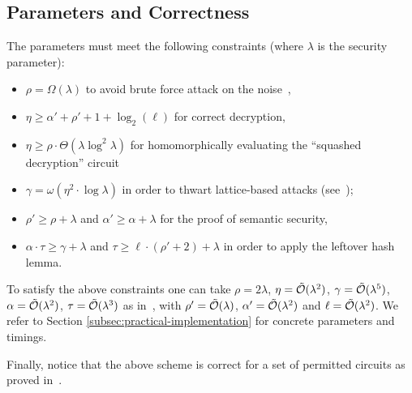 \documentclass{llncs}
\renewcommand\geq\geqslant
\newcommand{\Ot}[1]{{\cal \tilde O}(#1)}
\newcommand\ignore[1]{}
\begin{document}
\subsection{Parameters and Correctness}

\label{s:constraints}

 The parameters must meet the following constraints (where $\lambda$ is the security parameter):
\begin{itemize}
\renewcommand{\labelitemi}{\tiny $\bullet$}
\itemsep.4em
\item $\rho = \Omega(\lambda)$ to avoid brute force attack on the noise~\cite{CN2012,CNT2012},

\item $\eta \geq \alpha'+\rho'+1+\log_2(\ell)$ for correct decryption,

\item  $\eta\geq \rho \cdot \Theta(\lambda\log^2\lambda)$ for
  homomorphically evaluating the ``squashed decryption'' circuit

\item $\gamma = \omega(\eta^2\cdot \log\lambda)$ in order to thwart
  lattice-based attacks (see~\cite{vDGHV2010,CMNT2011});

\item $\rho' \geq \rho + \lambda$ and  $\alpha' \geq \alpha+\lambda$  for
  the proof of semantic security,

\item $\alpha\cdot \tau\geq \gamma+\lambda$ and $\tau \geq \ell \cdot
  (\rho'+2) + \lambda$ in order to apply the
  leftover hash lemma.
\end{itemize}

To satisfy the above constraints one can take $\rho=2\lambda$,
$\eta=\Ot{\lambda^2}$, $\gamma=\Ot{\lambda^5}$,
$\alpha=\Ot{\lambda^2}$, $\tau=\Ot{\lambda^3}$ as in~\cite{CNT2012},
with $\rho'=\Ot{\lambda}$, $\alpha'=\Ot{\lambda^2}$ and $\ell=\Ot{\lambda^2}$.\ignore{ 
The main difference with the original DGHV scheme is that the
ciphertext expansion ratio becomes $\gamma/\ell=\Ot{\lambda^3}$
instead of $\gamma=\Ot{\lambda^5}$. However the public key size (using
the compressed public key technique from~\cite{CNT2012}) becomes 
$\Ot{\lambda^7}$ instead of $\Ot{\lambda^5}$.}
We refer to Section 
\ref{subsec:practical-implementation} for concrete parameters and
timings.

Finally, notice that the above scheme is correct for a set of permitted circuits as proved in~\cite[Appendix~A]{CLT2013a}.

\end{document}
